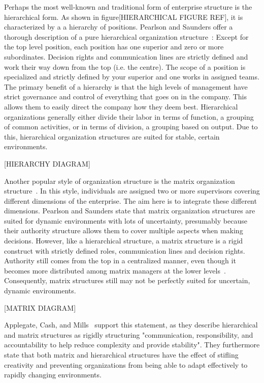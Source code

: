 Perhaps the most well-known and traditional form of enterprise structure is the hierarchical form. As shown in figure[HIERARCHICAL FIGURE REF], it is characterized by a a hierarchy of positions. Pearlson and Saunders offer a thorough description of a pure hierarchical organization structure~\cite{pearlson2009}: Except for the top level position, each position has one superior and zero or more subordinates. Decision rights and communication lines are strictly defined and work their way down from the top (i.e. the centre). The scope of a position is specialized and strictly defined by your superior and one works in assigned teams. The primary benefit of a hierarchy is that the high levels of management have strict governance and control of everything that goes on in the company. This allows them to easily direct the company how they deem best. Hierarchical organizations generally either divide their labor in terms of function, a grouping of common activities, or in terms of division, a grouping based on output. Due to this, hierarchical organization structures are suited for stable, certain environments. 

[HIERARCHY DIAGRAM]

Another popular style of organization structure is the matrix organization structure~\cite{pearlson2009}. In this style, individuals are assigned two or more supervisors covering different dimensions of the enterprise. The aim here is to integrate these different dimensions. Pearlson and Saunders state that matrix organization structures are suited for dynamic environments with lots of uncertainty, presumably because their authority structure allows them to cover multiple aspects when making decisions. However, like a hierarchical structure, a matrix structure is a rigid construct with strictly defined roles, communication lines and decision rights. Authority still comes from the top in a centralized manner, even though it becomes more distributed among matrix managers at the lower levels~\cite{pearlson2009}. Consequently, matrix structures still may not be perfectly suited for uncertain, dynamic environments. 

[MATRIX DIAGRAM]

Applegate, Cash, and Mills~\cite{applegate1988} support this statement, as they describe hierarchical and matrix structures as rigidly structuring "communication, responsibility, and accountability to help reduce complexity and provide  stability". They furthermore state that both matrix and hierarchical structures have the effect of stifling creativity and preventing organizations from being able to adapt effectively to rapidly changing environments. 

